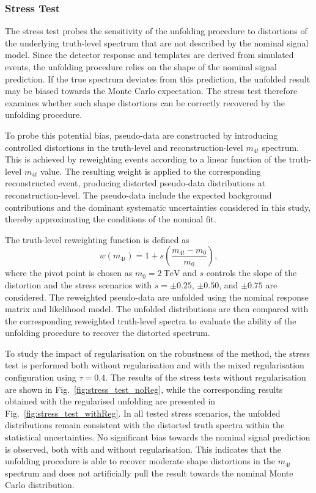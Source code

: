 \subsubsection*{\textbf{Stress Test}}

The stress test probes the sensitivity of the unfolding procedure to distortions of the underlying truth-level spectrum that are not described by the nominal signal model. 
Since the detector response and templates are derived from simulated events, the unfolding procedure relies on the shape of the nominal signal prediction. 
If the true spectrum deviates from this prediction, the unfolded result may be biased towards the Monte Carlo expectation. 
The stress test therefore examines whether such shape distortions can be correctly recovered by the unfolding procedure.

To probe this potential bias, pseudo-data are constructed by introducing controlled distortions in the truth-level and reconstruction-level $m_{4t}$ spectrum. 
This is achieved by reweighting events according to a linear function of the truth-level $m_{4t}$ value. 
The resulting weight is applied to the corresponding reconstructed event, producing distorted pseudo-data distributions at reconstruction-level. 
The pseudo-data include the expected background contributions and the dominant systematic uncertainties considered in this study, thereby approximating the conditions of the nominal fit.

The truth-level reweighting function is defined as
\begin{equation}
w(m_{4t}) = 1 + s \left(\frac{m_{4t}-m_0}{m_0}\right),
\end{equation}
where the pivot point is chosen as $m_0 = 2~\mathrm{TeV}$ and $s$ controls the slope of the distortion and the stress scenarios with $s=\pm0.25$, $\pm0.50$, and $\pm0.75$ are considered.
The reweighted pseudo-data are unfolded using the nominal response matrix and likelihood model. 
The unfolded distributions are then compared with the corresponding reweighted truth-level spectra to evaluate the ability of the unfolding procedure to recover the distorted spectrum. 

To study the impact of regularisation on the robustness of the method, the stress test is performed both without regularisation and with the mixed regularisation configuration using $\tau=0.4$. 
The results of the stress tests without regularisation are shown in Fig.~\ref{fig:stress_test_noReg}, while the corresponding results obtained with the regularised unfolding are presented in Fig.~\ref{fig:stress_test_withReg}. 
In all tested stress scenarios, the unfolded distributions remain consistent with the distorted truth spectra within the statistical uncertainties. 
No significant bias towards the nominal signal prediction is observed, both with and without regularisation. 
This indicates that the unfolding procedure is able to recover moderate shape distortions in the $m_{4t}$ spectrum and does not artificially pull the result towards the nominal Monte Carlo distribution.

